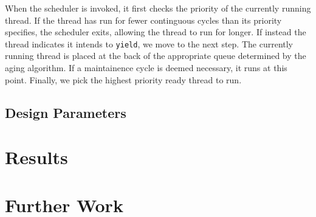 \documentclass{article}
\begin{document}
When the scheduler is invoked, it first checks the priority of the currently running thread.
If the thread has run for fewer continguous cycles than its priority specifies, the scheduler exits, allowing the thread to run for longer.
If instead the thread indicates it intends to \verb|yield|, we move to the next step.
The currently running thread is placed at the back of the appropriate queue determined by the aging algorithm.
If a maintainence cycle is deemed necessary, it runs at this point.
Finally, we pick the highest priority ready thread to run.

\subsection{Design Parameters}

\section{Results}
\section{Further Work}
\end{document}
